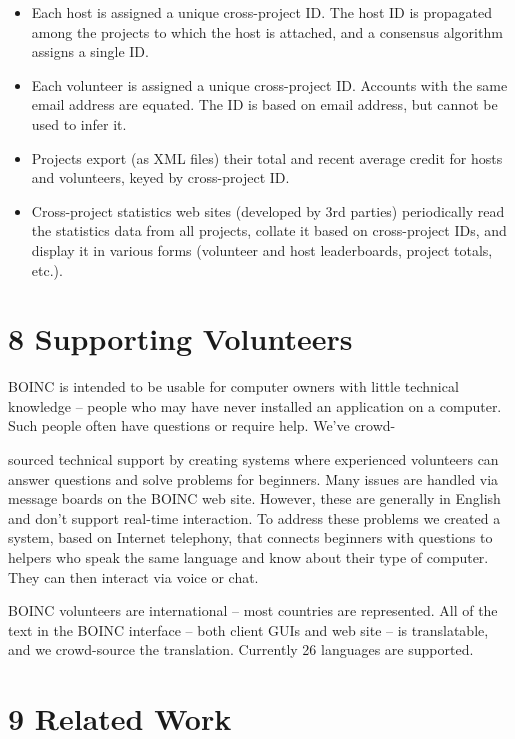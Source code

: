 \documentclass[
]{article}
\providecommand{\tightlist}{%
  \setlength{\itemsep}{0pt}\setlength{\parskip}{0pt}}
\begin{document}
\begin{itemize}
\tightlist
\item
  Each host is assigned a unique cross-project ID. The host ID is
  propagated among the projects to which the host is attached, and a
  consensus algorithm assigns a single ID.\\
\item
  Each volunteer is assigned a unique cross-project ID. Accounts with
  the same email address are equated. The ID is based on email address,
  but cannot be used to infer it.\\
\item
  Projects export (as XML files) their total and recent average credit
  for hosts and volunteers, keyed by cross-project ID.\\
\item
  Cross-project statistics web sites (developed by 3rd parties)
  periodically read the statistics data from all projects, collate it
  based on cross-project IDs, and display it in various forms (volunteer
  and host leaderboards, project totals, etc.).
\end{itemize}

\section{8 Supporting Volunteers}\label{supporting-volunteers}

BOINC is intended to be usable for computer owners with little technical
knowledge -- people who may have never installed an application on a
computer. Such people often have questions or require help. We've crowd-

sourced technical support by creating systems where experienced
volunteers can answer questions and solve problems for beginners. Many
issues are handled via message boards on the BOINC web site. However,
these are generally in English and don't support real-time interaction.
To address these problems we created a system, based on Internet
telephony, that connects beginners with questions to helpers who speak
the same language and know about their type of computer. They can then
interact via voice or chat.

BOINC volunteers are international -- most countries are represented.
All of the text in the BOINC interface -- both client GUIs and web site
-- is translatable, and we crowd-source the translation. Currently 26
languages are supported.

\section{9 Related Work}\label{related-work}
\end{document}
